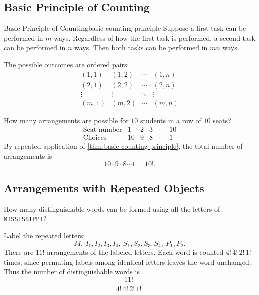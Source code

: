 \subsection{Basic Principle of Counting}

\begin{theorem}{Basic Principle of Counting}{basic-counting-principle}
  Suppose a first task can be performed in $m$ ways. Regardless of how the first task is performed, a second task can be performed in $n$ ways. Then both tasks can be performed in $mn$ ways.
\end{theorem}

The possible outcomes are ordered pairs:
\[
  \begin{array}{cccc}
    (1,1)  & (1,2)  & \cdots & (1,n)  \\
    (2,1)  & (2,2)  & \cdots & (2,n)  \\
    \vdots & \vdots & \ddots & \vdots \\
    (m,1)  & (m,2)  & \cdots & (m,n)
  \end{array}
\]

\begin{example}
  How many arrangements are possible for $10$ students in a row of $10$ seats?
  \[
    \begin{array}{c|ccccc}
      \text{Seat number} & 1  & 2 & 3 & \cdots & 10 \\
      \text{Choices}     & 10 & 9 & 8 & \cdots & 1
    \end{array}
  \]
  By repeated application of \ref{thm:basic-counting-principle}, the total number of arrangements is
  \[
    10 \cdot 9 \cdot 8 \cdots 1 = 10!.
  \]
\end{example}

\subsection{Arrangements with Repeated Objects}

\begin{example}
  How many distinguishable words can be formed using all the letters of \texttt{MISSISSIPPI}?

  Label the repeated letters:
  \[
    M,\ I_1,I_2,I_3,I_4,\ S_1,S_2,S_3,S_4,\ P_1,P_2.
  \]
  There are $11!$ arrangements of the labeled letters. Each word is counted $4!\,4!\,2!\,1!$ times, since permuting labels among identical letters leaves the word unchanged. Thus the number of distinguishable words is
  \[
    \frac{11!}{4!\,4!\,2!\,1!}.
  \]
\end{example}


